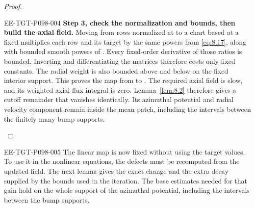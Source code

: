 \begin{proof}
\begin{EESegment}{EE-TGT-P098-004}
\textbf{Step 3, check the normalization and bounds, then build the axial field.} Moving from rows
normalized at  to a chart based at a fixed
 multiplies each row and its target by the same powers from
\eqref{eq:8.17}, along with bounded smooth powers of . Every fixed-order
derivative of those ratios is bounded. Inverting and differentiating the matrices therefore costs
only fixed constants. The radial weight is also bounded above and below on the fixed interior
support. This proves the map from  to
. The required axial field is slow, and its weighted
axial-flux integral is zero. Lemma~\ref{lem:8.2} therefore gives a cutoff remainder that vanishes
identically. Its azimuthal potential and radial velocity component remain inside the mean patch,
including the intervals between the finitely many bump supports.
\end{EESegment}
\end{proof}

\begin{EESegment}{EE-TGT-P098-005}
The linear map is now fixed without using the target values. To use it in the nonlinear equations,
the defects must be recomputed from the updated field. The next lemma gives the exact change and the
extra decay supplied by the bounds used in the iteration. The base estimates needed for that gain
hold on the whole support of the azimuthal potential, including the intervals between the bump
supports.
\end{EESegment}

